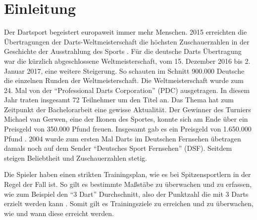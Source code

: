 
\chapter{Einleitung}
\label{chap:intro}



Der Dartsport begeistert europaweit immer mehr Menschen. 2015 erreichten die Übertragungen der Darts-Weltmeisterschaft die höchsten Zuschauerzahlen in der Geschichte der Ausstrahlung des Sports \autocite{quotenmeter2017}. Für die deutsche Darts Übertragung war die kürzlich abgeschlossene Weltmeisterschaft, vom 15. Dezember 2016 bis 2. Januar 2017, eine weitere Steigerung. So schauten im Schnitt 900.000 Deutsche die einzelnen Runden der Weltmeisterschaft. Die Weltmeisterschaft wurde zum 24. Mal von der "`Professional Darts Corporation"' (PDC) ausgetragen. In diesem Jahr traten insgesamt 72 Teilnehmer um den Titel an. Das Thema hat zum Zeitpunkt der Bachelorarbeit eine gewisse Aktualität. 
Der Gewinner des Turniers Michael van Gerwen, eine der Ikonen des Sportes, konnte sich am Ende über ein Preisgeld von 350.000 Pfund freuen. Insgesamt gab es ein Preisgeld von 1.650.000 Pfund \autocite{PDC2016}.
2004 wurde zum ersten Mal Darts im Deutschen Fernsehen übetragen damals noch auf dem Sender "`Deutsches Sport Fernsehen"' (DSF)\autocite{GaOn2016}. Seitdem steigen Beliebtheit und Zuschauerzahlen stetig.

Die Spieler haben einen strikten Trainingsplan, wie es bei Spitzensportlern in der Regel der Fall ist. So gilt es bestimmte Maßstäbe zu überwachen und zu erfassen, wie zum Beispiel den "`3 Dart"' Durchschnitt, also der Punktzahl die mit 3 Darts erzielt werden kann \autocite[98-100]{dph2015}.
Somit gilt es Trainingsziele zu erreichen und zu überwachen, wie und wann diese erreicht werden.

